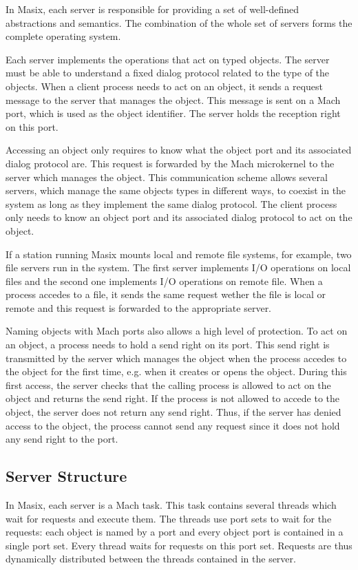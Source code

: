 	In Masix, each server is responsible for providing a set of well-defined
abstractions and semantics. The combination of the whole set of servers
forms the complete operating system.

	Each server implements the operations that act on typed objects. The
server must be able to understand a fixed dialog protocol related to the
type of the objects. When a client process needs to act on an object, it sends
a request message to the server that manages the object. This message is sent
on a Mach port, which is used as the object identifier. The server holds the
reception right on this port.

	Accessing an object only requires to know what the object port and its
associated dialog protocol are. This
request is forwarded by the Mach microkernel to the server which manages the
object. This communication scheme allows several servers, which manage the
same objects types in different ways, to coexist in the system as long as
they implement the same dialog protocol. The client process only needs to
know an object port and its associated dialog protocol to act on the object.

	If a station running Masix mounts local and remote file
systems, for example, two file servers run in the system.
The first server implements I/O
operations on local files and the second one implements I/O operations on
remote file. When a process accedes to a file, it sends the same request
wether the
file is local or remote and this request is forwarded to the appropriate
server.

	Naming objects with Mach ports also allows a high level of protection.
To act on an object, a process needs to hold a send right on its port. This
send right is transmitted by the server which manages the object when the
process accedes to the object for the first time, e.g. when it creates or
opens the object. During this first access, the server checks that the calling
process is allowed to act on the object and returns the send right. If the
process is not allowed to accede to the object, the server does not return
any send right. Thus, if the server has denied access to the object, the
process cannot send any request since it does not hold any send right to the
port.


\subsection {Server Structure}

	In Masix, each server is a Mach task. This task contains several
threads which wait for requests and execute them. The threads use port sets
to wait for the requests: each object is named by a port and every object
port is contained in a single port set. Every thread waits for requests on
this port set. Requests are thus dynamically distributed between the
threads contained in the server.

